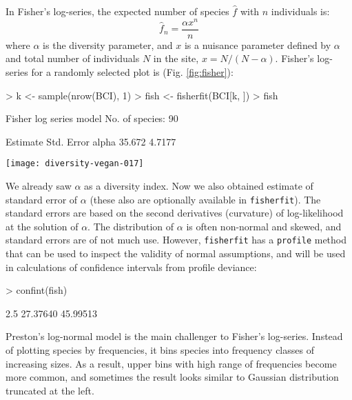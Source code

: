 \documentclass[a4paper,10pt]{amsart}
\begin{document}
In Fisher's log-series, the expected number of species $\hat f$ with $n$
individuals is:
\begin{equation}
\hat f_n = \frac{\alpha x^n}{n}
\end{equation}
where $\alpha$ is the diversity parameter, and $x$ is a nuisance
parameter defined by $\alpha$ and total number
of individuals $N$ in the site, $x = N/(N-\alpha)$.  Fisher's
log-series for a randomly selected plot is (Fig. \ref{fig:fisher}):
\begin{Schunk}
\begin{Sinput}
> k <- sample(nrow(BCI), 1)
> fish <- fisherfit(BCI[k, ])
> fish
\end{Sinput}
\begin{Soutput}
Fisher log series model
No. of species: 90 

      Estimate Std. Error
alpha   35.672     4.7177
\end{Soutput}
\end{Schunk}
\begin{SCfigure}
\texttt{[image: diversity-vegan-017]}
\caption{Fisher's log-series fitted to one randomly selected site
  (9).}
\label{fig:fisher}
\end{SCfigure}
We already saw $\alpha$ as a diversity index.  Now we also obtained
estimate of standard error of $\alpha$ (these also are optionally
available in \texttt{fisherfit}).  The standard errors are based on
the second derivatives (curvature) of log-likelihood at the solution
of $\alpha$.  The distribution of $\alpha$ is often non-normal
and skewed, and standard errors are of not much use.  However,
\texttt{fisherfit} has a \texttt{profile} method that can be used to
inspect the validity of normal assumptions, and will be used in
calculations of confidence intervals from profile deviance:
\begin{Schunk}
\begin{Sinput}
> confint(fish)
\end{Sinput}
\begin{Soutput}
   2.5 %   97.5 % 
27.37640 45.99513 
\end{Soutput}
\end{Schunk}

Preston's log-normal model is the main challenger to Fisher's
log-series.  Instead of plotting species by frequencies, it bins
species into frequency classes of increasing sizes.  As a result,
upper bins with high range of frequencies become more common, and
sometimes the result looks similar to Gaussian distribution truncated
at the left.
\end{document}
